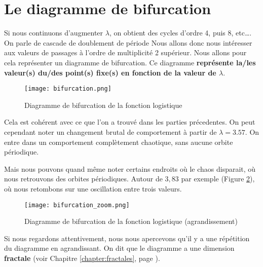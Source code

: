 \newpage
\section{Le diagramme de bifurcation}
Si nous continuons d'augmenter $\lambda$, on obtient des cycles d'ordre 4, puis 8, etc\dots. On parle de cascade de doublement de période
Nous allons donc nous intéresser aux valeurs de passages à l'ordre de multiplicité 2 supérieur. Nous allons pour cela représenter un diagramme de bifurcation. Ce diagramme \textbf{représente la/les valeur(s) du/des point(s) fixe(s) en fonction de la valeur de $\lambda$}.

\begin{figure}[!ht]
    \begin{center}
        \texttt{[image: bifurcation.png]}
    \end{center}
    \caption{\label{fig:bifurcation}Diagramme de bifurcation de la fonction logistique}
\end{figure}

Cela est cohérent avec ce que l'on a trouvé dans les parties précedentes. On peut cependant noter un changement brutal de comportement à partir de $\lambda = 3.57$. On entre dans un comportement complètement chaotique, sans aucune orbite périodique.

Mais nous pouvons quand même noter certains endroits où le chaos disparait, où nous retrouvons des orbites périodiques. Autour de $3,83$ par exemple (Figure \ref{fig:bifurcation_zoom}), où nous retombons sur une oscillation entre trois valeurs. 

\begin{figure}[!ht]
    \begin{center}
        \texttt{[image: bifurcation\_zoom.png]}
    \end{center}
    \caption{\label{fig:bifurcation_zoom}Diagramme de bifurcation de la fonction logistique (agrandissement)}
\end{figure}

Si nous regardons attentivement, nous nous apercevons qu'il y a une répétition du diagramme en agrandissant. On dit que le diagramme a une dimension \textbf{fractale} (voir Chapitre \ref{chapter:fractales}, page \pageref{chapter:fractales}).